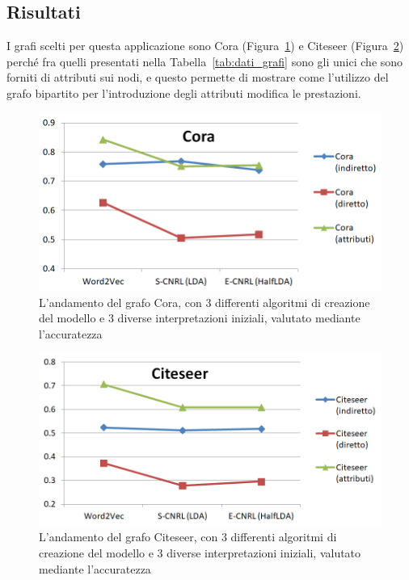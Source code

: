 \subsection{Risultati}
I grafi scelti per questa applicazione sono Cora (Figura~\ref{fig:VC_cora}) e Citeseer (Figura~\ref{fig:VC_citeseer}) perché fra quelli presentati nella Tabella~\ref{tab:dati_grafi} sono gli unici che sono forniti di attributi sui nodi, e questo permette di mostrare come l'utilizzo del grafo bipartito per l'introduzione degli attributi modifica le prestazioni.
%
\begin{figure}[htp]
	\centering
	\includegraphics[width=\linewidth]{immagini/VC_cora}
	\caption{L'andamento del grafo Cora, con 3 differenti algoritmi di creazione del modello e 3 diverse interpretazioni iniziali, valutato mediante l'accuratezza}
	\label{fig:VC_cora}
\end{figure}
%
\begin{figure}[htp]
	\centering
	\includegraphics[width=\linewidth]{immagini/VC_citeseer}
	\caption{L'andamento del grafo Citeseer, con 3 differenti algoritmi di creazione del modello e 3 diverse interpretazioni iniziali, valutato mediante l'accuratezza}
	\label{fig:VC_citeseer}
\end{figure}
